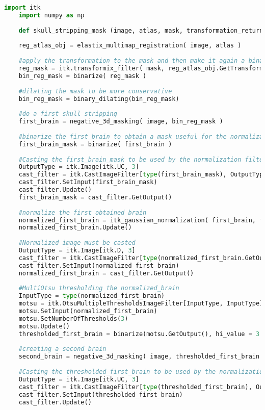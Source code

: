 \documentclass{standalone}
\begin{document}
\lstset{style=python}
	\begin{lstlisting}[language=python, caption=Brain Extraction Function, label=skull_stripping]
	import itk
	import numpy as np
	
	def skull_stripping_mask (image, atlas, mask, transformation_return = False):
	
    reg_atlas_obj = elastix_multimap_registration( image, atlas )
    
    #apply the transformation to the mask and then make it again a binary image
    reg_mask = itk.transformix_filter( mask, reg_atlas_obj.GetTransformParameterObject() )
    bin_reg_mask = binarize( reg_mask )
    
    #dilating the mask to be more conservative
    bin_reg_mask = binary_dilating(bin_reg_mask)
    
    #do a first skull stripping
    first_brain = negative_3d_masking( image, bin_reg_mask )
    
    #binarize the first_brain to obtain a mask useful for the normalization
    first_brain_mask = binarize( first_brain )
    
    #Casting the first_brain_mask to be used by the normalization filter
    OutputType = itk.Image[itk.UC, 3]
    cast_filter = itk.CastImageFilter[type(first_brain_mask), OutputType].New()
    cast_filter.SetInput(first_brain_mask)
    cast_filter.Update()
    first_brain_mask = cast_filter.GetOutput()
    
    #normalize the first obtained brain
    normalized_first_brain = itk_gaussian_normalization( first_brain, first_brain_mask )
    normalized_first_brain.Update()
    
    #Normalized image must be casted
    OutputType = itk.Image[itk.D, 3]
    cast_filter = itk.CastImageFilter[type(normalized_first_brain.GetOutput() ), OutputType].New()
    cast_filter.SetInput(normalized_first_brain)
    normalized_first_brain = cast_filter.GetOutput()
    
    #MultiOtsu thresholding the normalized_brain
    InputType = type(normalized_first_brain)
    motsu = itk.OtsuMultipleThresholdsImageFilter[InputType, InputType].New()
    motsu.SetInput(normalized_first_brain)
    motsu.SetNumberOfThresholds(3)
    motsu.Update()
    thresholded_first_brain = binarize(motsu.GetOutput(), hi_value = 3 )
    
    #creating a second brain
    second_brain = negative_3d_masking( image, thresholded_first_brain )
    
    #Casting the thresholded_first_brain to be used by the normalization filter
    OutputType = itk.Image[itk.UC, 3]
    cast_filter = itk.CastImageFilter[type(thresholded_first_brain), OutputType].New()
    cast_filter.SetInput(thresholded_first_brain)
    cast_filter.Update()
    

\end{lstlisting}
\end{document}
